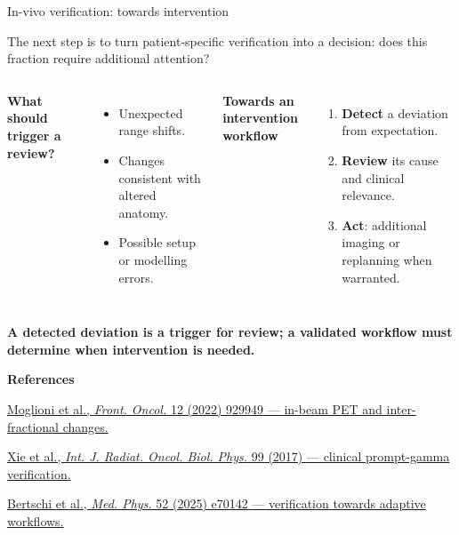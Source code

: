 \documentclass[aspectratio=169,11pt]{beamer}
\newcommand{\hi}[1]{\textcolor{crRed}{#1}}
\begin{document}
\begin{frame}{In-vivo verification: towards intervention}

{\small
The next step is to turn patient-specific verification into a decision:
\hi{does this fraction require additional attention?}\par
}

\vspace{0.25cm}
\begin{columns}[T,onlytextwidth]
{\footnotesize\bfseries\color{PTblue}What should trigger a review?\par}
\vspace{0.08cm}
{\small
\begin{itemize}
  \setlength{\itemsep}{0.10cm}
  \item Unexpected range shifts.
  \item Changes consistent with altered anatomy.
  \item Possible setup or modelling errors.
\end{itemize}
}

{\footnotesize\bfseries\color{PTblue}Towards an intervention workflow\par}
\vspace{0.08cm}
{\small
\begin{enumerate}
  \setlength{\itemsep}{0.08cm}
  \item \textbf{Detect} a deviation from expectation.
  \item \textbf{Review} its cause and clinical relevance.
  \item \textbf{Act}: additional imaging or replanning when warranted.
\end{enumerate}
}
\end{columns}

\vspace{0.18cm}
{\footnotesize\bfseries\color{darkred}
A detected deviation is a trigger for review; a validated workflow must determine
when intervention is needed.\par
}

\vfill
{\fontsize{6}{7}\selectfont\color{crGrey}\raggedright
\textbf{References}\par
\href{https://doi.org/10.3389/fonc.2022.929949}
{Moglioni et al., \textit{Front. Oncol.} 12 (2022) 929949 --- in-beam PET and inter-fractional changes.}\par
\href{https://pubmed.ncbi.nlm.nih.gov/28816148/}
{Xie et al., \textit{Int. J. Radiat. Oncol. Biol. Phys.} 99 (2017) --- clinical prompt-gamma verification.}\par
\href{https://doi.org/10.1002/mp.70142}
{Bertschi et al., \textit{Med. Phys.} 52 (2025) e70142 --- verification towards adaptive workflows.}\par
}
\end{frame}
\end{document}
